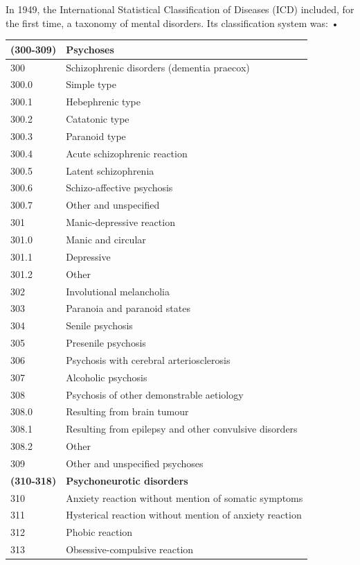 In 1949, the International Statistical Classification of Diseases (ICD) included, for the first time, a taxonomy of mental disorders. Its classification system was:
 •  \begin{longtable}[!t]{ | p{2cm} | p{11.8cm} | }
\hline

\textbf{(300-309)}&\textbf{Psychoses} \\ \hline
300&Schizophrenic disorders (dementia praecox) \\
300.0&     Simple type\\
300.1&     Hebephrenic type\\
300.2&     Catatonic type\\
300.3&     Paranoid type\\
300.4&     Acute schizophrenic reaction\\
300.5&     Latent schizophrenia\\
300.6&     Schizo-affective psychosis\\
300.7&     Other and unspecified\\
301&Manic-depressive reaction\\
301.0&     Manic and circular\\
301.1&     Depressive\\
301.2&     Other\\
302&Involutional melancholia\\
303&Paranoia and paranoid states\\
304&Senile psychosis\\
305&Presenile psychosis\\
306&Psychosis with cerebral arteriosclerosis\\
307&Alcoholic psychosis\\
308&Psychosis of other demonstrable aetiology\\
308.0&     Resulting from brain tumour\\
308.1&     Resulting from epilepsy and other convulsive disorders\\
308.2&     Other\\
309&Other and unspecified psychoses\\ \hline
\textbf{(310-318)}&\textbf{Psychoneurotic disorders} \\ \hline
310&Anxiety reaction without mention of somatic symptoms\\
311&Hysterical reaction without mention of anxiety reaction\\
312&Phobic reaction\\
313&Obsessive-compulsive reaction\\

\end{longtable}
